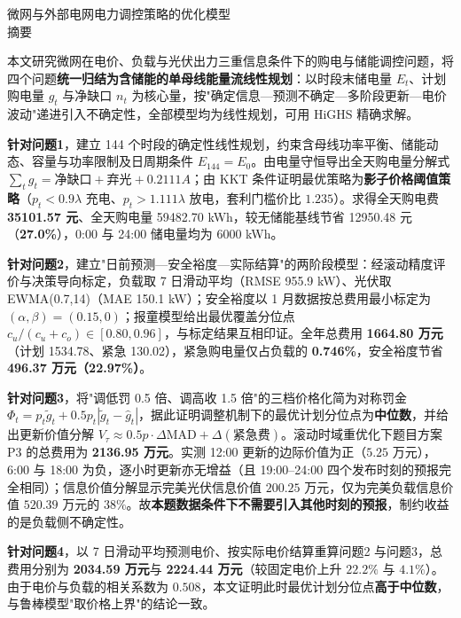 \begin{center}
  {\heiti{} 微网与外部电网电力调控策略的优化模型}\\[6pt]
  {\heiti{} 摘\quad 要}
\end{center}

\begingroup
{}

本文研究微网在电价、负载与光伏出力三重信息条件下的购电与储能调控问题，将四个问题\textbf{统一归结为含储能的单母线能量流线性规划}：以时段末储电量 $E_t$、计划购电量 $g_t$ 与净缺口 $n_t$ 为核心量，按"确定信息—预测不确定—多阶段更新—电价波动"递进引入不确定性，全部模型均为线性规划，可用 HiGHS 精确求解。

\textbf{针对问题1}，建立 144 个时段的确定性线性规划，约束含母线功率平衡、储能动态、容量与功率限制及日周期条件 $E_{144}=E_0$。由电量守恒导出全天购电量分解式 $\sum_tg_t=\text{净缺口}+\text{弃光}+0.2111A$；由 KKT 条件证明最优策略为\textbf{影子价格阈值策略}（$p_t<0.9\lambda$ 充电、$p_t>1.111\lambda$ 放电，套利门槛价比 $1.235$）。求得全天购电费 \textbf{35101.57 元}、全天购电量 59482.70 \si{kWh}，较无储能基线节省 12950.48 元（\textbf{27.0\%}），0:00 与 24:00 储电量均为 6000 \si{kWh}。

\textbf{针对问题2}，建立"日前预测—安全裕度—实际结算"的两阶段模型：经滚动精度评价与决策导向标定，负载取 7 日滑动平均（RMSE 955.9 \si{kW}）、光伏取 EWMA(0.7,14)（MAE 150.1 \si{kW}）；安全裕度以 1 月数据按总费用最小标定为 $(\alpha,\beta)=(0.15,0)$；报童模型给出最优覆盖分位点 $c_u/(c_u+c_o)\in[0.80,0.96]$，与标定结果互相印证。全年总费用 \textbf{1664.80 万元}（计划 1534.78、紧急 130.02），紧急购电量仅占负载的 \textbf{0.746\%}，安全裕度节省 \textbf{496.37 万元（22.97\%）}。

\textbf{针对问题3}，将"调低罚 0.5 倍、调高收 1.5 倍"的三档价格化简为对称罚金 $\Phi_t=p_t\tilde g_t+0.5p_t|\tilde g_t-\hat g_t|$，据此证明调整机制下的最优计划分位点为\textbf{中位数}，并给出更新价值分解 $V_\tau\approx0.5p\cdot\Delta\mathrm{MAD}+\Delta(\text{紧急费})$。滚动时域重优化下题目方案 P3 的总费用为 \textbf{2136.95 万元}。实测 12:00 更新的边际价值为正（$5.25$ 万元），6:00 与 18:00 为负，逐小时更新亦无增益（且 19:00--24:00 四个发布时刻的预报完全相同）；信息价值分解显示完美光伏信息价值 $200.25$ 万元，仅为完美负载信息价值 $520.39$ 万元的 $38\%$。故\textbf{本题数据条件下不需要引入其他时刻的预报}，制约收益的是负载侧不确定性。

\textbf{针对问题4}，以 7 日滑动平均预测电价、按实际电价结算重算问题2 与问题3，总费用分别为 \textbf{2034.59 万元}与 \textbf{2224.44 万元}（较固定电价上升 $22.2\%$ 与 $4.1\%$）。由于电价与负载的相关系数为 $0.508$，本文证明此时最优计划分位点\textbf{高于中位数}，与鲁棒模型"取价格上界"的结论一致。

